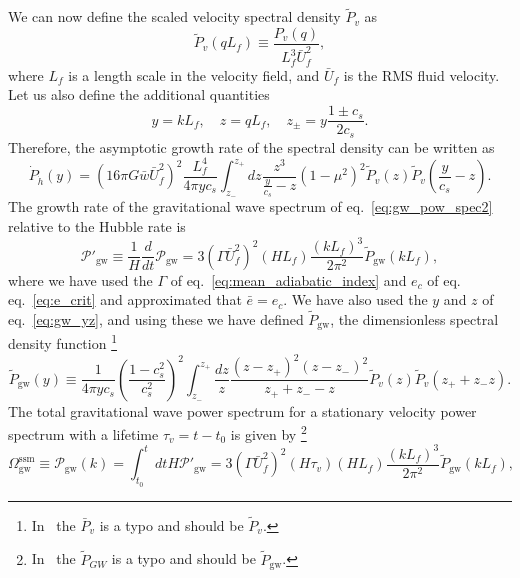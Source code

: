 We can now define the scaled velocity spectral density $\tilde{P}_v$ as
\begin{equation}
\tilde{P}_v (qL_f) \equiv \frac{P_v(q)}{L_f^3 \bar{U}_f^2},
\label{eq:tilde_p_v}
\end{equation}
where $L_f$ is a length scale in the velocity field, and $\bar{U}_f$ is the RMS fluid velocity.
Let us also define the additional quantities
\begin{equation}
y = kL_f, \quad z = qL_f, \quad z_\pm = y \frac{1 \pm c_s}{2 c_s}.
\label{eq:gw_yz}
\end{equation}
Therefore, the asymptotic growth rate of the spectral density can be written as
\begin{equation}
\dot{P}_{\dot{h}}(y) =
\left( 16 \pi G \bar{w} \bar{U}_f^2 \right)^2
\frac{L_f^4}{4 \pi y c_s}
\int_{z_-}^{z_+} dz
\frac{z^3}{\frac{y}{c_s} - z}
(1 - \mu^2)^2
\tilde{P}_v (z) \tilde{P}_v \left( \frac{y}{c_s} - z \right).
\end{equation}
The growth rate of the gravitational wave spectrum of eq.~\eqref{eq:gw_pow_spec2} relative to the Hubble rate is
\cite[eq. 3.46]{hindmarsh_gw_pt_2019}
\begin{equation}
\mathcal{P}'_{\text{gw}} \equiv \frac{1}{H} \frac{d}{dt} \mathcal{P}_{\text{gw}}
= 3 \left( \Gamma \bar{U}_f^2 \right)^2 (HL_f) \frac{(kL_f)^3}{2 \pi^2} \tilde{P}_{\text{gw}} (kL_f),
\label{eq:pow_gw_prime}
\end{equation}
where we have used the $\Gamma$ of eq.~\eqref{eq:mean_adiabatic_index} and $e_c$ of eq. eq.~\eqref{eq:e_crit} and approximated that $\bar{e} = e_c$.
We have also used the $y$ and $z$ of eq.~\eqref{eq:gw_yz}, and using these we have defined $\tilde{P}_{\text{gw}}$,
the dimensionless spectral density function
\cite[eq. 3.47]{hindmarsh_gw_pt_2019}%
\footnote{In~\cite{hindmarsh_gw_pt_2019} the $\bar{P}_v$ is a typo and should be $\tilde{P}_v$.}
\begin{equation}
\tilde{P}_\text{gw} (y) \equiv \frac{1}{4\pi yc_s} \left(\frac{1-c_s^2}{c_s^2}\right)^2
\int_{z_-}^{z_+} \frac{dz}{z}
\frac{(z-z_+)^2(z-z_-)^2}{z_+ + z_- - z}
\tilde{P}_v (z) \tilde{P}_v (z_+ + z_- z).
\label{eq:spectral_density}
\end{equation}
The total gravitational wave power spectrum for a stationary velocity power spectrum with a lifetime $\tau_v = t - t_0$ is given by
\cite[eq. 3.48]{hindmarsh_gw_pt_2019}%
\footnote{In~\cite{hindmarsh_gw_pt_2019} the $\tilde{P}_{GW}$ is a typo and should be $\tilde{P}_\text{gw}$.}
\begin{equation}
\Omega_\text{gw}^\text{ssm}
\equiv \mathcal{P}_\text{gw}(k)
= \int_{t_0}^{t} dt H \mathcal{P}'_\text{gw}
= 3 \left( \Gamma \bar{U}_f^2 \right)^2 (H \tau_v)(H L_f) \frac{(kL_f)^3}{2\pi^2} \tilde{P}_\text{gw} (kL_f),
\label{eq:gw_pow_spec3}
\end{equation}
